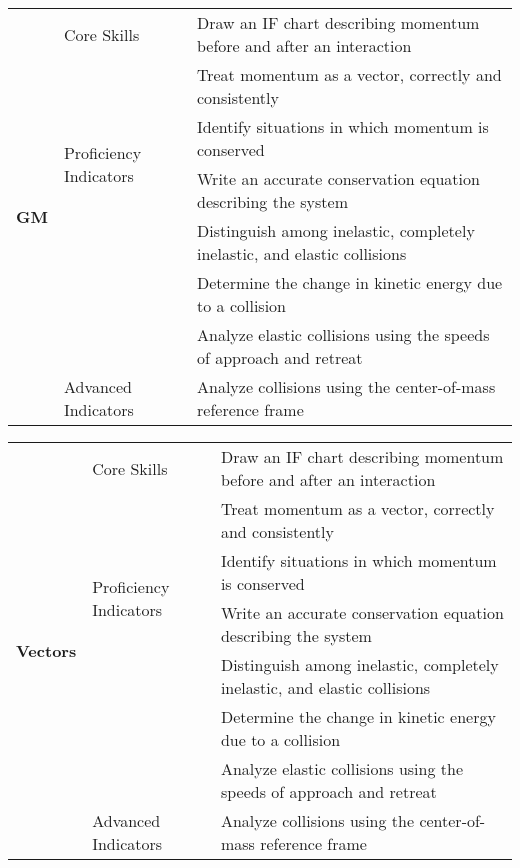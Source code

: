 \centering
{\footnotesize \begin{tabular}{| p{.35 cm} | p{1.7 cm} | p{14.3 cm} | }
\hline
\multirow{8}{*}{\begin{sideways}\parbox{4mm}{{\large{\bf GM}}}\end{sideways}}  &Core Skills 		& Draw an IF chart describing momentum before and after an interaction  \\ \cline{3-3}
& 					& Treat momentum as a vector, correctly and consistently  \\ \cline{2-3}					
& \multirow{2}{*}{\parbox{1.7cm}{Proficiency Indicators}}	& Identify situations in which momentum is conserved \\ \cline{3-3}
&					& Write an accurate conservation equation describing the system \\ \cline{3-3}
& 					& Distinguish among inelastic, completely inelastic, and elastic collisions \\ \cline{3-3}
& 					& Determine the change in kinetic energy due to a collision \\ \cline{3-3}
&					& Analyze elastic collisions using the speeds of approach and retreat \\ \cline{2-3}
& Advanced Indicators	& Analyze collisions using the center-of-mass reference frame \\ \hline
\end{tabular} }
\vspace{2 mm}


\centering
{\footnotesize \begin{tabular}{| p{.35 cm} | p{1.7 cm} | p{14.3 cm} | }
\hline
\multirow{8}{*}{\begin{sideways}\parbox{4mm}{{\large{\bf Vectors}}}\end{sideways}}  &Core Skills 		& Draw an IF chart describing momentum before and after an interaction  \\ \cline{3-3}
& 					& Treat momentum as a vector, correctly and consistently  \\ \cline{2-3}					
& \multirow{2}{*}{\parbox{1.7cm}{Proficiency Indicators}}	& Identify situations in which momentum is conserved \\ \cline{3-3}
&					& Write an accurate conservation equation describing the system \\ \cline{3-3}
& 					& Distinguish among inelastic, completely inelastic, and elastic collisions \\ \cline{3-3}
& 					& Determine the change in kinetic energy due to a collision \\ \cline{3-3}
&					& Analyze elastic collisions using the speeds of approach and retreat \\ \cline{2-3}
& Advanced Indicators	& Analyze collisions using the center-of-mass reference frame \\ \hline
\end{tabular} }
\vspace{2 mm}


